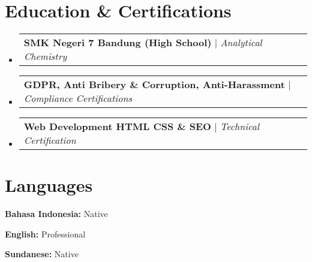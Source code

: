 \documentclass[a4paper, 11pt]{article}
\makeatletter
\newcommand{\resumeProjectHeading}[2]{
    \item
    \begin{tabular*}{0.987\textwidth}{l@{\extracolsep{\fill}}r}
      \small#1\\
    \end{tabular*}\vspace{-7pt}
}
\newcommand{\resumeSubHeadingListStart}{\begin{itemize}[leftmargin=0.1in, label={}]}
\newcommand{\resumeSubHeadingListEnd}{\end{itemize}\vspace{5pt}}
\makeatother
\begin{document}
\section{Education \& Certifications}
    \resumeSubHeadingListStart
        \resumeProjectHeading
            {\textbf{SMK Negeri 7 Bandung (High School)} $|$ \emph{Analytical Chemistry}}{2009 -- 2011}
        \resumeProjectHeading
            {\textbf{GDPR, Anti Bribery \& Corruption, Anti-Harassment} $|$ \emph{Compliance Certifications}}{}
        \resumeProjectHeading
            {\textbf{Web Development HTML CSS \& SEO} $|$ \emph{Technical Certification}}{}
    \resumeSubHeadingListEnd

\section{Languages}
    \resumeSubHeadingListStart
        \small{
            \item \textbf{Bahasa Indonesia:} Native
            \item \textbf{English:} Professional
            \item \textbf{Sundanese:} Native
        }
    \resumeSubHeadingListEnd
\end{document}
